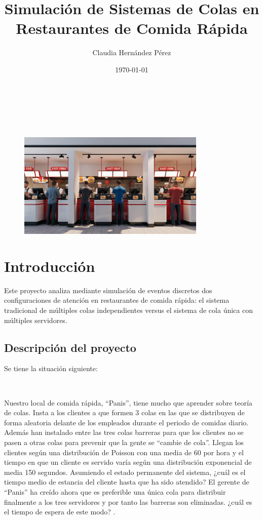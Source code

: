 \documentclass{article}
\title{Simulación de Sistemas de Colas en Restaurantes de Comida Rápida}
\author{Claudia Hernández Pérez}
\date{\today}
\begin{document}
\maketitle

\

\

\begin{figure}[h]
    \centering
    \includegraphics[width=0.8\textwidth]{./images/restaurant.jpg}
\end{figure}

\newpage

\tableofcontents

\newpage

\section{Introducción}\label{sec:introduccion}
Este proyecto analiza mediante simulación de eventos discretos dos configuraciones de atención en restaurantes de comida rápida: el sistema tradicional de múltiples colas independientes versus el sistema de cola única con múltiples servidores.

\subsection{Descripción del proyecto}
Se tiene la situación siguiente: 

\

Nuestro local de comida rápida, “Panis”, tiene mucho que aprender sobre teoría 
de colas. Insta a los clientes a que formen 3 colas en las que se distribuyen de 
forma aleatoria delante de los empleados durante el periodo de comidas diario. 
Además han instalado entre las tres colas barreras para que los clientes no se 
pasen a otras colas para prevenir que la gente se “cambie de cola”. Llegan los 
clientes según una distribución de Poisson con una media de 60 por hora y el 
tiempo en que un cliente es servido varía según una distribución exponencial de 
media 150 segundos. Asumiendo el estado permanente del sistema, ¿cuál es el 
tiempo medio de estancia del cliente hasta que ha sido atendido? El gerente de 
“Panis” ha creído ahora que es preferible una única cola para distribuir finalmente a 
los tres servidores y por tanto las barreras son eliminadas. ¿cuál es el tiempo de 
espera de este modo? \cite{autor2015}.
\end{document}
